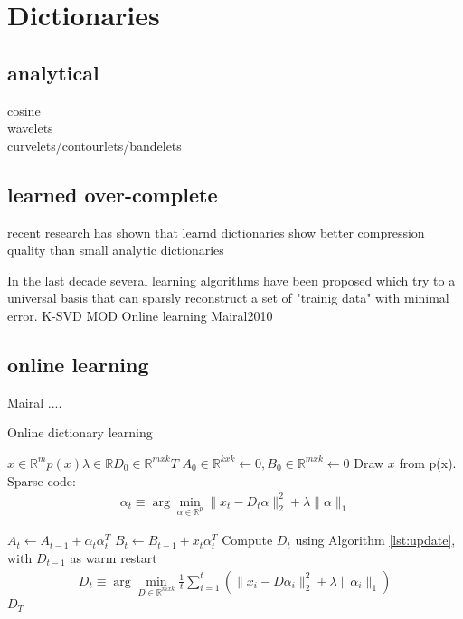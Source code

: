 \section{Dictionaries}
\subsection{analytical}
\begin{description}
 \item[cosine]
 \item[wavelets]
 \item[curvelets/contourlets/bandelets]
\end{description}

\subsection{learned over-complete}
recent research has shown that learnd dictionaries show better compression quality than small analytic dictionaries \cite{Aharon2006} \cite{Chen1998} 


In the last decade several learning algorithms have been proposed which try to a universal basis that 
can sparsly reconstruct a set of "trainig data" with minimal error. 
K-SVD
MOD
Online learning
Mairal2010

\subsection{online learning}
\label{sec:mairal}
Mairal .... \cite{Mairal2010}

\begin{algorithm}
\caption{Online dictionary learning \cite{Mairal2010}}
\begin{algorithmic}[1]
\REQUIRE $x \in \mathbb{R}^m  p \left( x \right) \lambda \in \mathbb{R} D_0 \in \mathbb{R}^{mxk} T$
\STATE $A_0 \in \mathbb{R}^{kxk} \gets  0, B_0 \in \mathbb{R}^{mxk}\gets 0$
\STATE Draw $x$ from p(x).
\STATE Sparse code:
\begin{align} 
\alpha_t \equiv \arg \min_{\alpha\in\mathbb{R}^{p}}  \lVert x_t - D_t\alpha \rVert^{2}_{2}  +  \lambda \lVert \alpha \rVert_{1}
\end{align}

\STATE $A_t \gets A_{t-1} + \alpha_t\alpha_t^T$
\STATE $B_t \gets B_{t-1} + x_t\alpha_t^T$
\STATE Compute $D_t$ using Algorithm \ref{lst:update}, with $D_{t-1}$ as warm restart 
\begin{align} 
D_t \equiv \arg\min_{D \in \mathbb{R}^{m x k}}  \frac{1}{t} \sum_{i=1}^t \left( \lVert x_i - D\alpha_i \rVert^{2}_{2}  +  \lambda \lVert \alpha_i \rVert_{1} \right) \label{eq:update}
\end{align}
\ENDFOR
\RETURN $D_T$
\end{algorithmic}
\end{algorithm}


